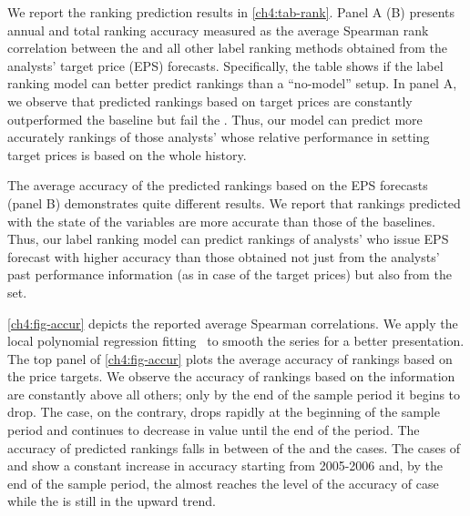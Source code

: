 \documentclass[a4paper,12pt,openright,notitlepage]{report}\usepackage[]{graphicx}\usepackage[]{color}
\begin{document}
We report the ranking prediction results in \ref{ch4:tab-rank}. Panel A (B)  presents annual and total ranking accuracy measured as the average Spearman rank correlation between the \true{} and all other label ranking methods obtained from the analysts' target price (EPS) forecasts. Specifically, the table shows  if the label ranking model can better predict rankings than a ``no-model'' setup.  In panel A, we observe that  predicted rankings based on target prices are constantly outperformed the  baseline but fail  the  \naive{}. Thus, our model can predict more accurately rankings of those analysts' whose  relative performance in setting target prices is based on the whole history. 

The average accuracy of the predicted rankings based on the EPS forecasts (panel B) demonstrates quite different results. We report that rankings predicted  with the \diff{} state of the variables are more accurate  than those of the baselines. Thus, our label ranking model can predict rankings of analysts' who issue EPS forecast with higher accuracy than those obtained not just from  the  analysts' past performance information (as in case of the target prices) but also from the \naive{} set.   

\ref{ch4:fig-accur} depicts the reported average Spearman correlations. We apply the local polynomial regression fitting~\citep{cleveland1992} to smooth the series for a better presentation. The top panel of \ref{ch4:fig-accur} plots the average accuracy of rankings based on the price targets. We observe the accuracy of rankings based on the \naive{} information are constantly above all others; only by the end of the sample period it begins to drop. The  case, on the contrary, drops rapidly at the beginning of the sample period and continues to decrease in value until the end of the period. The accuracy of predicted rankings falls in between of the \naive{} and the  cases. The cases of \diff{} and \random{} show a constant increase in accuracy starting from 2005-2006  and, by the end of the sample period, the \random{} almost reaches the level of the accuracy of \naive{} case while the \diff{} is still in the upward trend.
\end{document}
